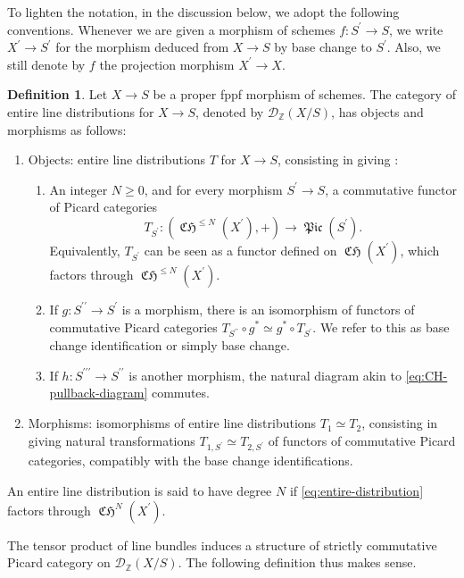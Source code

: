 \documentclass[JEP,XML,SOM,Unicode,published]{cedram}
\theoremstyle{plain}
\theoremstyle{definition}
\newtheorem{definition}[theorem]{Definition}
\newcommand{\ZBbb}{\mathbb Z}
\newcommand{\Dcal}{\mathcal D}
\newcommand{\bis}{\prime\prime}
\newcommand{\tris}{\prime\prime\prime}
\DeclareMathOperator{\CHfrak}{\mathfrak{CH}}
\DeclareMathOperator{\Picfr}{\mathfrak{Pic}}
\begin{document}
To lighten the notation, in the discussion below, we adopt the following conventions. Whenever we are given a morphism of schemes $f\colon S^{\prime}\to S$, we write $X^{\prime}\to S^{\prime}$ for the morphism deduced from $X\to S$ by base change to $S^{\prime}$. Also, we still denote by $f$ the projection morphism $X^{\prime}\to X$.
\begin{definition}\label{def:distribution}
Let $X\to S$ be a proper fppf morphism of schemes. The category of entire line distributions for $X\to S$, denoted by $\Dcal_{\ZBbb}(X/S)$, has objects and morphisms as follows:
\begin{enumerate}
\item Objects: entire line distributions $T$ for $X\to S$, consisting in giving :
\begin{enumerate}
\item\label{item:distribution-1} An integer $N\geq 0$, and for every morphism $S^{\prime}\to S$, a commutative functor of Picard categories\vspace*{-3pt}
\begin{equation}\label{eq:entire-distribution}
T_{S^{\prime}}\colon (\CHfrak^{\leq N}(X^{\prime}), +) \to \Picfr(S^{\prime}).
\end{equation}
Equivalently, $T_{S^{\prime}}$ can be seen as a functor defined on $\CHfrak(X^{\prime})$, which factors through $\CHfrak^{\leq N}(X^{\prime})$.

\item\label{item:distribution-2} If $g: S^{\bis} \to S^{\prime}$ is a morphism, there is an isomorphism of functors of commutative Picard categories $T_{S^{\bis}}\circ g^\ast \simeq g^\ast \circ T_{S^\prime}$. We refer to this as base change identification or simply base change.
\item\label{item:distribution-3} If $h: S^{\tris} \to S^{\bis}$ is another morphism, the natural diagram akin to \eqref{eq:CH-pullback-diagram} commutes.
\end{enumerate}
\item Morphisms: isomorphisms of entire line distributions $T_{1}\simeq T_{2}$, consisting in giving natural transformations $T_{1, S^{\prime}}\simeq T_{2, S^{\prime}}$ of functors of commutative Picard categories, compatibly with the base change identifications.
\end{enumerate}
An entire line distribution is said to have degree $N$ if \eqref{eq:entire-distribution} factors through $\CHfrak^{N}(X^{\prime})$.
\end{definition}
The tensor product of line bundles induces a structure of strictly commutative Picard category on $\Dcal_{\ZBbb}(X/S)$. The following definition thus makes sense.
\end{document}
